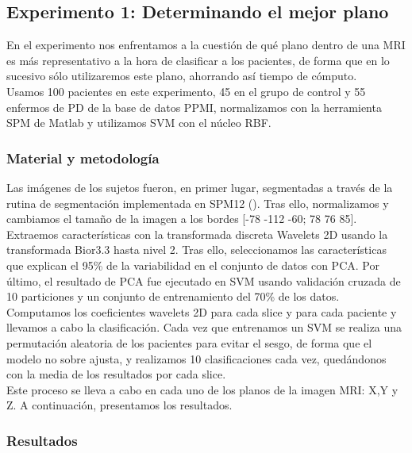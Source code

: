 \newpage

\subsection{Experimento 1: Determinando el mejor plano}

En el experimento nos enfrentamos a la cuestión de qué plano dentro de una MRI es más representativo a la hora de clasificar a los pacientes, de forma que en lo sucesivo sólo utilizaremos este plano, ahorrando así tiempo de cómputo. \\

Usamos 100 pacientes en este experimento, 45 en el grupo de control y 55 enfermos de PD de la base de datos PPMI, normalizamos con la herramienta SPM de Matlab  y utilizamos SVM con el núcleo RBF.

\subsubsection{Material y metodología}

Las imágenes de los sujetos fueron, en primer lugar, segmentadas a través de la rutina de segmentación implementada en SPM12 (\cite{spm}). Tras ello, normalizamos y cambiamos el tamaño de la imagen a los bordes [-78 -112 -60; 78 76 85]. Extraemos características con la transformada discreta Wavelets 2D usando la transformada Bior3.3 hasta nivel 2. Tras ello, seleccionamos las características que explican el 95\% de la variabilidad en el conjunto de datos con PCA. Por último, el resultado de PCA fue ejecutado en SVM usando validación cruzada de 10 particiones y un conjunto de entrenamiento del 70\% de los datos. \\

Computamos los coeficientes wavelets 2D para cada slice y para cada paciente y llevamos a cabo la clasificación. Cada vez que entrenamos un SVM se realiza una permutación aleatoria de los pacientes para evitar el sesgo, de forma que el modelo no sobre ajusta, y realizamos 10 clasificaciones cada vez, quedándonos con la media de los resultados por cada slice. \\

Este proceso se lleva a cabo en cada uno de los planos de la imagen MRI: X,Y y Z. A continuación, presentamos los resultados.

\subsubsection{Resultados}


